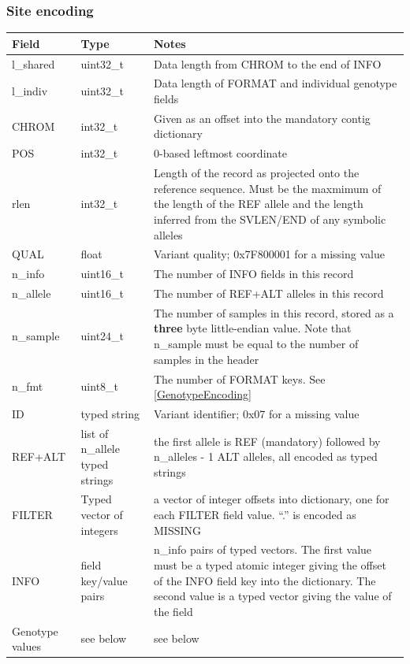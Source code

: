 \documentclass[8pt]{article}
\begin{document}
\subsubsection{Site encoding}
\label{BcfSiteEncoding}

{\small
\begin{tabular}{|l | l | p{30em} | } \hline
\textbf{Field} &	\textbf{Type} &	\textbf{Notes} \\ \hline
l\_shared & uint32\_t & Data length from CHROM to the end of INFO \\ \hline
l\_indiv  & uint32\_t & Data length of FORMAT and individual genotype fields \\ \hline
CHROM     & int32\_t  & Given as an offset into the mandatory contig dictionary \\ \hline
POS       & int32\_t  & 0-based leftmost coordinate \\ \hline
rlen      & int32\_t  & Length of the record as projected onto the reference sequence.
                        Must be the maxmimum of the length of the REF allele and the length
                        inferred from the SVLEN/END of any symbolic alleles \\ \hline
QUAL      & float     & Variant quality; 0x7F800001 for a missing value \\ \hline
n\_info   & uint16\_t & The number of INFO fields in this record \\ \hline
n\_allele & uint16\_t & The number of REF+ALT alleles in this record \\ \hline
n\_sample & uint24\_t & The number of samples in this record, stored as a \textbf{three} byte little-endian value.
                        Note that n\_sample must be equal to the number of samples in the header \\ \hline
n\_fmt    & uint8\_t  & The number of FORMAT keys.  See \ref{GenotypeEncoding} \\ \hline
ID       & typed string & Variant identifier; 0x07 for a missing value \\ \hline
REF+ALT  & list of n\_allele typed strings & the first allele is REF (mandatory) followed by n\_alleles - 1 ALT
                                             alleles, all encoded as typed strings \\ \hline
FILTER   & Typed vector of integers & a vector of integer offsets into dictionary, one for each FILTER field value.
                                      ``.'' is encoded as MISSING \\ \hline
INFO     & field key/value pairs & n\_info pairs of typed vectors.
                                   The first value must be a typed atomic integer giving the offset of the INFO field
                                   key into the dictionary.
                                   The second value is a typed vector giving the value of the field \\ \hline
Genotype values & see below & see below \\ \hline
\end{tabular}}
\end{document}
